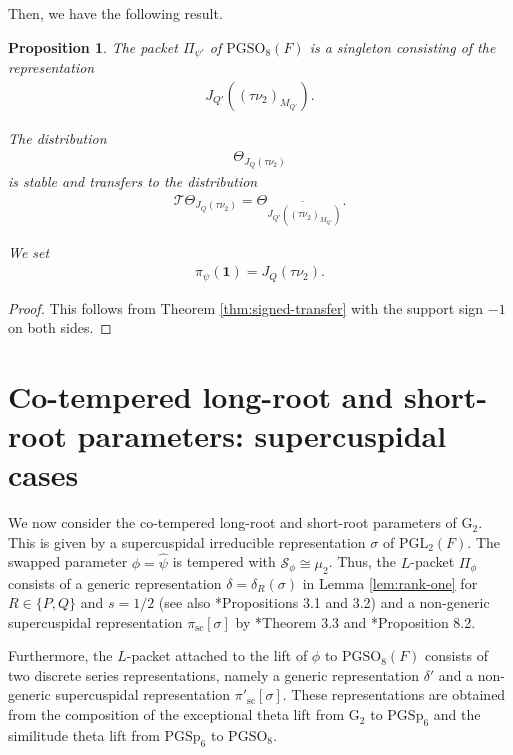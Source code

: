 \documentclass[12pt]{amsart}
\theoremstyle{definition}
\theoremstyle{plain}
\newtheorem{proposition}[definition]{Proposition}
\theoremstyle{remark}
\def\PGL{\mathrm{PGL}}
\def\PGSO{\mathrm{PGSO}}
\def\PGSp{\mathrm{PGSp}}
\newcommand{\cS}{\mathcal{S}}
\newcommand{\cT}{\mathcal{T}}
\numberwithin{equation}{section}
\newcommand{\rG}{\mathrm{G}}
\begin{document}
Then, we have the following result.
\begin{proposition}\label{prop:subregular-full-ecr}
      The packet $\Pi_{\psi'}$ of $\PGSO_8(F)$ is a singleton consisting of the representation
      \begin{align*}
            J_{Q'}((\tau \nu_2)_{M_{Q'}}).
      \end{align*}

      The distribution 
      \begin{align*}
            \Theta_{J_{Q}(\tau \nu_2)}
      \end{align*}
      is stable and transfers to the distribution
      \begin{align*}
            \cT \Theta_{J_{Q}(\tau \nu_2)} = \Theta_{\widetilde{J_{Q'}((\tau \nu_2)_{M_{Q'}})}}.  
      \end{align*}

      We set 
      \begin{align*}
            \pi_{\psi}(\mathbf{1}) = J_{Q}(\tau \nu_2).
      \end{align*}
\end{proposition}

\begin{proof}
      This follows from Theorem \ref{thm:signed-transfer} with the support sign $-1$ on both sides.
\end{proof}


\section{Co-tempered long-root and short-root parameters: supercuspidal cases}\label{sec:co-tempered-long-short-supercuspidal}

We now consider the co-tempered long-root and short-root parameters of ${\rG_2}$.
This is given by a supercuspidal irreducible representation $\sigma$ of $\PGL_2(F)$.
The swapped parameter $\phi = \widehat\psi$ is tempered with $\cS_{\phi} \cong \mu_2$.
Thus, the $L$-packet $\Pi_{\phi}$ consists of a generic representation $\delta = \delta_{R}(\sigma)$ in Lemma \ref{lem:rank-one} for $R \in \{P, Q\}$ and $s = 1/2$ (see also \cite{GanSavin2023-HoweDualityDichotomyExceptionalThetaCorrespondences}*{Propositions 3.1 and 3.2}) and a non-generic supercuspidal representation $\pi_{\mathrm{sc}}[\sigma]$ by \cite{Xu2017-CuspidalSupportDiscreteSeries}*{Theorem 3.3} and \cite{GanSavin2023-LocalLanglandsConjectureG2}*{Proposition 8.2}.

Furthermore, the $L$-packet attached to the lift of $\phi$ to $\PGSO_8(F)$ consists of two discrete series representations, namely a generic representation $\delta'$ and a non-generic supercuspidal representation $\pi'_{\mathrm{sc}}[\sigma]$.
These representations are obtained from the composition of the exceptional theta lift from $\rG_2$ to $\PGSp_6$ and the similitude theta lift from $\PGSp_6$ to $\PGSO_8$.
\end{document}
